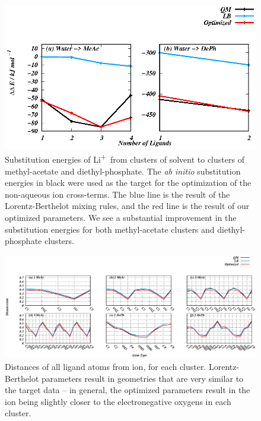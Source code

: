 \documentclass[journal=langd5,manuscript=article]{achemso}
\newcommand{\li}{Li\textsuperscript{+}~}
\begin{document}
\begin{figure}
    \caption{Substitution energies of \li from clusters of solvent to clusters of methyl-acetate and diethyl-phosphate. The \emph{ab initio} substitution energies in black
    were used as the target for the optimization of the non-aqueous ion cross-terms. The blue line is the result of the Lorentz-Berthelot mixing rules, and the red line
    is the result of our optimized parameters. We see a substantial improvement in the substitution energies for both methyl-acetate clusters and diethyl-phosphate clusters.}
    \label{fig:energies}
    \includegraphics[width=\textwidth]{Figure_S1.eps}
\end{figure}
\clearpage
\begin{figure}
    \caption{Distances of all ligand atoms from ion, for each cluster. Lorentz-Berthelot parameters result in geometries that are very similar to the target data -- in general, the 
    optimized parameters result in the ion being slightly closer to the electronegative oxygens in each cluster.}
    \label{fig:distances}
    \includegraphics[width=\textwidth]{Figure_S2.eps}
\end{figure}
\ifdefined\COMPLETE
\else

\end{document}
